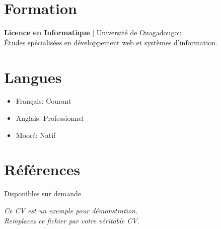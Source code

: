\documentclass[11pt,a4paper]{article}
\begin{document}
\section*{Formation}
\textbf{Licence en Informatique} | Université de Ouagadougou\\
Études spécialisées en développement web et systèmes d'information.

\section*{Langues}
\begin{itemize}
\item Français: Courant
\item Anglais: Professionnel
\item Mooré: Natif
\end{itemize}

\section*{Références}
Disponibles sur demande

\vfill
\begin{center}
\textit{Ce CV est un exemple pour démonstration.}\\
\textit{Remplacez ce fichier par votre véritable CV.}
\end{center}
\end{document}

